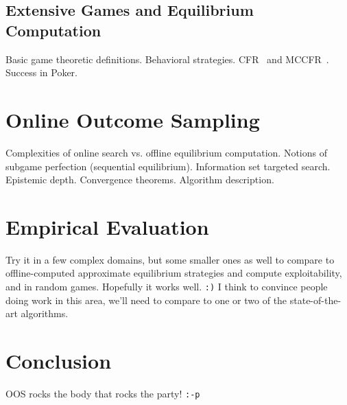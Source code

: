 \documentclass[letterpaper]{article}
\begin{document}
\subsection{Extensive Games and Equilibrium Computation}

Basic game theoretic definitions. Behavioral strategies. 
CFR~\cite{CFR} and MCCFR~\cite{Lanctot09Sampling}. Success in Poker.

\section{Online Outcome Sampling}

Complexities of online search vs. offline equilibrium computation. Notions of subgame perfection (sequential equilibrium). Information set targeted search. Epistemic depth.
Convergence theorems. Algorithm description.

\section{Empirical Evaluation}

Try it in a few complex domains, but some smaller ones as well to compare to offline-computed approximate equilibrium strategies and compute exploitability, and in random games. 
Hopefully it works well. {\tt :)} I think to convince people doing work in this area, we'll need 
to compare to one or two of the state-of-the-art algorithms. 

\section{Conclusion}

OOS rocks the body that rocks the party! {\tt :-p}  




\end{document}
